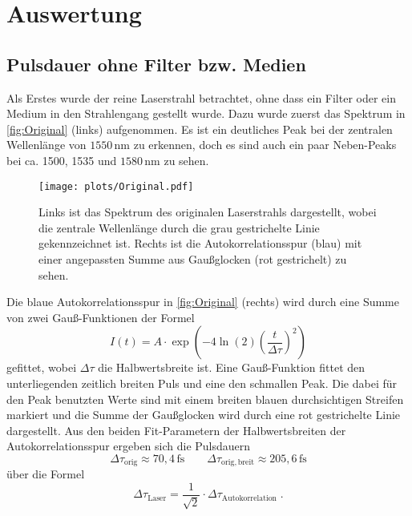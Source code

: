 \newpage
\section{Auswertung}
\label{sec:auswertung}
\subsection{Pulsdauer ohne Filter bzw. Medien}
    Als Erstes wurde der reine Laserstrahl betrachtet, ohne dass ein Filter oder ein Medium in den Strahlengang gestellt wurde.
    Dazu wurde zuerst das Spektrum in \autoref{fig:Original} (links) aufgenommen.
    Es ist ein deutliches Peak bei der zentralen Wellenlänge von $1550\,\si{\nano\meter}$ zu erkennen, doch es sind auch ein paar Neben-Peaks bei ca. 1500, 1535 und $1580\,\si{\nano\meter}$ zu sehen.
    \vspace*{-0.3cm}
    \begin{figure}[ht]
        \centering\captionsetup{format=plain}
        \texttt{[image: plots/Original.pdf]} \vspace*{-0.5cm}
        \caption{Links ist das Spektrum des originalen Laserstrahls dargestellt, wobei die zentrale Wellenlänge durch die grau gestrichelte Linie gekennzeichnet ist. Rechts ist die Autokorrelationsspur (blau) mit einer angepassten Summe aus Gaußglocken (rot gestrichelt) zu sehen.}
        \label{fig:Original}
    \end{figure}
    \FloatBarrier
    Die blaue Autokorrelationsspur in \autoref{fig:Original} (rechts) wird durch eine Summe von zwei Gauß-Funktionen der Formel
    \begin{equation}
        I(t) = A \cdot \exp\left(-4\ln(2)\left(\frac{t}{\Delta\tau}\right)^2\right)
    \end{equation}
    gefittet, wobei $\Delta\tau$ die Halbwertsbreite ist.
    Eine Gauß-Funktion fittet den unterliegenden zeitlich breiten Puls und eine den schmallen Peak.
    Die dabei für den Peak benutzten Werte sind mit einem breiten blauen durchsichtigen Streifen markiert und die Summe der Gaußglocken wird durch eine rot gestrichelte Linie dargestellt.
    Aus den beiden Fit-Parametern der Halbwertsbreiten der Autokorrelationsspur ergeben sich die Pulsdauern
    \begin{equation*}
        \Delta \tau_{\mathrm{orig}} \approx 70,4\,\si{\femto\second} \qquad \Delta \tau_{\mathrm{orig,breit}} \approx 205,6\,\si{\femto\second}
    \end{equation*}
    über die Formel
    \begin{equation}
        \Delta \tau_{\mathrm{Laser}} = \frac{1}{\sqrt{2}} \cdot \Delta \tau_{\mathrm{Autokorrelation}}\;.
    \end{equation}


